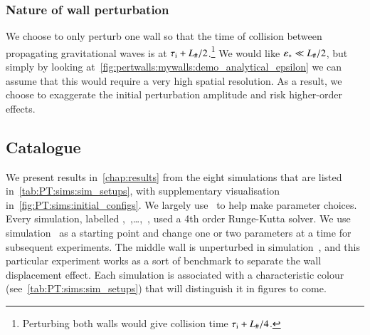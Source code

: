 \subsubsection{Nature of wall perturbation}
    We choose to only perturb one wall so that the time of collision between propagating gravitational waves is at $ \tau_\mathrm{i} + L_\#/2$.\footnote{
        Perturbing both walls would give collision time $\tau_\mathrm{i} + L_{\#}/4$.
    } %
    We would like $\varepsilon_\ast \ll L_\#/2$, but simply by looking at~\cref{fig:pertwalls:mywalls:demo_analytical_epsilon} we can assume that this would require a very high spatial resolution. As a result, we choose to exaggerate the initial perturbation amplitude and risk higher-order effects.%

    







\subsection{Catalogue}

   


    We present results in~\cref{chap:results} from the eight simulations that are listed in~\cref{tab:PT:sims:sim_setups}, with supplementary visualisation in~\cref{fig:PT:sims:initial_configs}. %
    We largely use~\citet{christiansenAsimulationDomainFormation2024} to help make parameter choices. 
    Every simulation, labelled ,~,\dots,~, used a 4th order Runge-Kutta solver. 
    We use simulation~ as a starting point and change one or two parameters at a time for subsequent experiments. The middle wall is unperturbed in simulation~, and this particular experiment works as a sort of benchmark to separate the wall displacement effect. 
    Each simulation is associated with a characteristic colour (see~\cref{tab:PT:sims:sim_setups}) that will distinguish it in figures to come.

